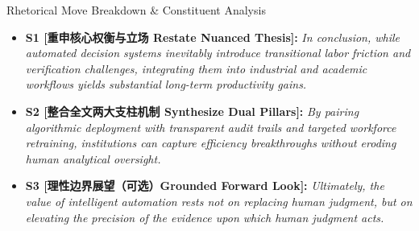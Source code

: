 \begin{TipBox}{Rhetorical Move Breakdown \& Constituent Analysis}
\begin{itemize}[leftmargin=1.5em]
  \item \textbf{S1 [重申核心权衡与立场 Restate Nuanced Thesis]:} \textit{In conclusion, while automated decision systems inevitably introduce transitional labor friction and verification challenges, integrating them into industrial and academic workflows yields substantial long-term productivity gains.}\par{}
  \item \textbf{S2 [整合全文两大支柱机制 Synthesize Dual Pillars]:} \textit{By pairing algorithmic deployment with transparent audit trails and targeted workforce retraining, institutions can capture efficiency breakthroughs without eroding human analytical oversight.}\par{}
  \item \textbf{S3 [理性边界展望（可选）Grounded Forward Look]:} \textit{Ultimately, the value of intelligent automation rests not on replacing human judgment, but on elevating the precision of the evidence upon which human judgment acts.}\par{}
\end{itemize}
\end{TipBox}
\medskip
\clearpage